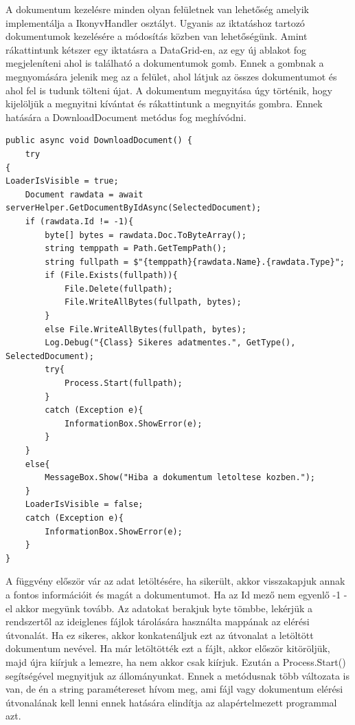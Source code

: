 \documentclass[
]{thesis-ekf}
\theoremstyle{definition}
\theoremstyle{remark}
\begin{document}
A dokumentum kezelésre minden olyan felületnek van lehetőség amelyik implementálja a IkonyvHandler osztályt. Ugyanis az iktatáshoz tartozó dokumentumok kezelésére a módosítás közben van lehetőségünk. Amint rákattintunk kétszer egy iktatásra a DataGrid-en, az egy új ablakot fog megjeleníteni ahol is található a dokumentumok gomb. Ennek a gombnak a megnyomására jelenik meg az a felület, ahol látjuk az összes dokumentumot és ahol fel is tudunk tölteni újat. A dokumentum megnyitása úgy történik, hogy kijelöljük a megnyitni kívántat és rákattintunk a megnyitás gombra. Ennek hatására a DownloadDocument metódus fog meghívódni.
\begin{lstlisting}[showstringspaces=false,caption={Dokumentum letöltése.},captionpos=b]
public async void DownloadDocument() {
	try
{
LoaderIsVisible = true;
	Document rawdata = await serverHelper.GetDocumentByIdAsync(SelectedDocument);
	if (rawdata.Id != -1){
		byte[] bytes = rawdata.Doc.ToByteArray();
		string temppath = Path.GetTempPath();
		string fullpath = $"{temppath}{rawdata.Name}.{rawdata.Type}";
		if (File.Exists(fullpath)){
			File.Delete(fullpath);
			File.WriteAllBytes(fullpath, bytes);
		}
		else File.WriteAllBytes(fullpath, bytes);
		Log.Debug("{Class} Sikeres adatmentes.", GetType(), SelectedDocument);
		try{
			Process.Start(fullpath);
		}
		catch (Exception e){
			InformationBox.ShowError(e);
		}
	}
	else{
		MessageBox.Show("Hiba a dokumentum letoltese kozben.");
	}
	LoaderIsVisible = false;
	catch (Exception e){
		InformationBox.ShowError(e);
	}
}
\end{lstlisting}

A függvény először vár az adat letöltésére, ha sikerült, akkor visszakapjuk annak a fontos információit és magát a dokumentumot. Ha az Id mező nem egyenlő -1 -el akkor megyünk tovább. Az adatokat berakjuk byte tömbbe, lekérjük a rendszertől az ideiglenes fájlok tárolására használta mappának az elérési útvonalát. Ha ez sikeres, akkor konkatenáljuk ezt az útvonalat a letöltött dokumentum nevével. Ha már letöltötték ezt a fájlt, akkor először kitöröljük, majd újra kiírjuk a lemezre, ha nem akkor csak kiírjuk. Ezután a Process.Start() segítségével megnyitjuk az állományunkat. Ennek a metódusnak több változata is van, de én a string paramétereset hívom meg, ami fájl vagy dokumentum elérési útvonalának kell lenni ennek hatására elindítja az alapértelmezett programmal azt.
\end{document}
